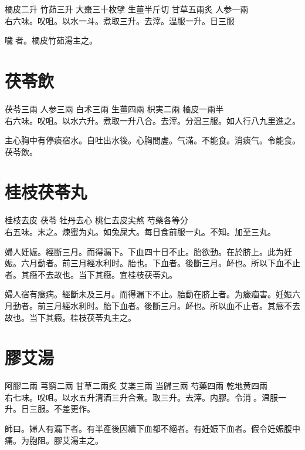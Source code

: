 橘皮{\scriptsize 二升} 竹茹{\scriptsize 三升} 大棗{\scriptsize 三十枚擘} 生薑{\scriptsize 半斤切} 甘草{\scriptsize 五兩炙} 人参{\scriptsize 一兩}\\
右六味。㕮咀。以水一斗。煮取三升。去滓。温服一升。日三服

噦{\sungtpii 𠱘}者。橘皮竹茹湯主之。

\section{茯苓飲}

茯苓{\scriptsize 三兩} 人参{\scriptsize 三兩} 白术{\scriptsize 三兩} 生薑{\scriptsize 四兩} 枳実{\scriptsize 二兩} 橘皮{\scriptsize 一兩半}\\
右六味。㕮咀。以水六升。煮取一升八合。去滓。分温三服。如人行八九里進之。

主心胸中有停痰宿水。自吐出水後。心胸間虗。气滿。不能食。消痰气。令能食。茯苓飲。

\section{桂枝茯苓丸}

桂枝{\scriptsize 去皮} 茯苓{ }牡丹{\scriptsize 去心} 桃仁{\scriptsize 去皮尖熬} 芍藥{\scriptsize 各等分}\\
右五味。末之。煉蜜为丸。如兔屎大。每日{\khaaitp 食前服}一丸。不知。加至三丸。

婦人妊娠。經斷三月。而得漏下。下血四十日不止。胎欲動。在於脐上。此为妊娠。六月動者。前三月經水利时。胎也。下血者。後斷三月。衃也。所以下血不止者。其癥不去故也。当下其癥。宜桂枝茯苓丸。{\wuben}

婦人宿有癥病。經斷未及三月。而得漏下不止。胎動在脐上者。为癥痼害。妊娠六月動者。前三月經水利时。胎下血者。後斷三月。衃也。所以血不止者。其癥不去故也。当下其癥。桂枝茯苓丸主之。{\dengben}

\section{膠艾湯}

阿膠{\scriptsize 二兩} 芎窮{\scriptsize 二兩} 甘草{\scriptsize 二兩炙} 艾枼{\scriptsize 三兩} 当歸{\scriptsize 三兩} 芍藥{\scriptsize 四兩} 乾地黄{\scriptsize 四兩}\\
右七味。㕮咀。以水五升清酒三升合煮。取三升。去滓。内膠。令消{\sungtpii 𥁞}。温服一升。日三服。不差更作。

師曰。婦人有漏下者。有半產後因續下血都不絕者。有妊娠下血者。假令妊娠腹中痛。为胞阻。膠艾湯主之。

